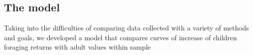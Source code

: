 \subsection{The model}
Taking into the difficulties of comparing data collected with a variety of methods and goals, we developed a model that compares curves of increase of children foraging returns with adult values within sample
